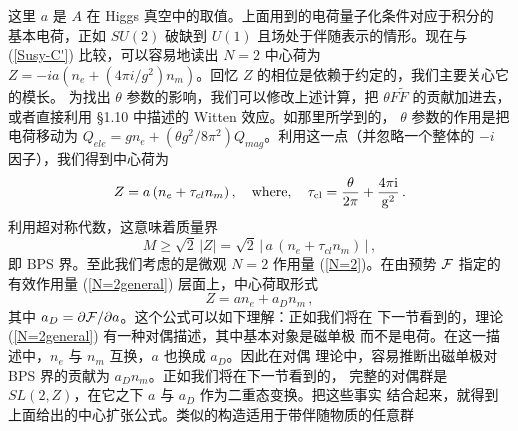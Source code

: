 这里 $a$ 是 $A$ 在 Higgs 真空中的取值。上面用到的电荷量子化条件对应于积分的
基本电荷，正如 $SU(2)$ 破缺到 $U(1)$ 且场处于伴随表示的情形。现在与
(\ref{Susy-C'}) 比较，可以容易地读出 $N=2$ 中心荷为 $Z=-ia(n_e+ (4\pi
i/g^2)n_m)$。回忆 $Z$ 的相位是依赖于约定的，我们主要关心它的模长。
为找出 $\theta$ 参数的影响，我们可以修改上述计算，把 $\theta F\widetilde F$
的贡献加进去，或者直接利用 §1.10 中描述的 Witten 效应。如那里所学到的，
$\theta$ 参数的作用是把电荷移动为
$Q_{ele}=gn_e+(\theta g^2/8\pi^2)Q_{mag}$。利用这一点（并忽略一个整体的
$-i$ 因子），我们得到中心荷为
$$
Z= a\,(n_e + \tau_{cl} n_m)\,,\quad\rm{where},\quad 
\tau_{cl} = \frac{\theta}{2\pi} + \frac{4\pi i}{g^2}\,.
$$
利用超对称代数，这意味着质量界
$$
M \geq \sqrt{2}\, |Z|= {\sqrt 2}\,|\,a\,(n_e + \tau_{cl} n_m )\,|\,,
$$
即 BPS 界。至此我们考虑的是微观 $N=2$ 作用量 (\ref{N=2})。在由预势 ${\cal F}$
指定的有效作用量 (\ref{N=2general}) 层面上，中心荷取形式
$$
Z = an_e + a_D n_m \,,
$$
其中 $a_D=\partial{\cal F}/\partial a$。这个公式可以如下理解：正如我们将在
下一节看到的，理论 (\ref{N=2general}) 有一种对偶描述，其中基本对象是磁单极
而不是电荷。在这一描述中，$n_e$ 与 $n_m$ 互换，$a$ 也换成 $a_D$。因此在对偶
理论中，容易推断出磁单极对 BPS 界的贡献为 $a_Dn_m$。正如我们将在下一节看到的，
完整的对偶群是 $SL(2,Z)$，在它之下 $a$ 与 $a_D$ 作为二重态变换。把这些事实
结合起来，就得到上面给出的中心扩张公式。类似的构造适用于带伴随物质的任意群
